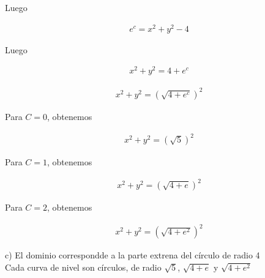 \documentclass{article}
\theoremstyle{definition}
\begin{document}
Luego

\begin{align*}
    e^c= x^2+y^2-4
\end{align*}

Luego

\begin{align*}
     x^2+y^2 = 4+e^c
\end{align*}

\begin{align*}
     x^2+y^2 = (\sqrt{4+e^c})^2
\end{align*}

Para $C=0$, obtenemos

\begin{align*}
     x^2+y^2 = (\sqrt{5})^2
\end{align*}


Para $C=1$, obtenemos

\begin{align*}
     x^2+y^2 = (\sqrt{4+e})^2
\end{align*}

Para $C=2$, obtenemos


\begin{align*}
     x^2+y^2 = (\sqrt{4+e^2})^2
\end{align*}


\newpage

c) El dominio correspondde a la parte extrena del círculo de radio 4 \\

Cada curva de nivel son círculos, de radio $\sqrt{5}$, $\sqrt{4+e}$ y $\sqrt{4+e^2}$
\end{document}
